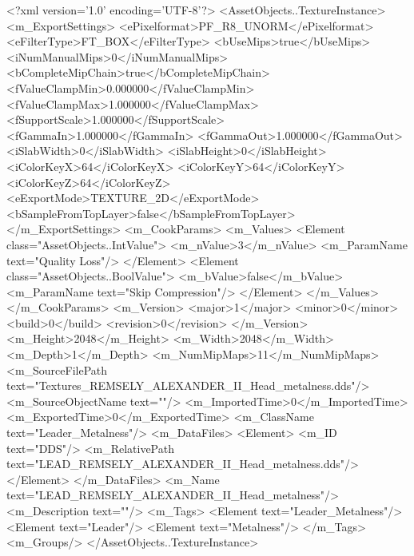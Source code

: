 <?xml version='1.0' encoding='UTF-8'?>
<AssetObjects..TextureInstance>
  <m_ExportSettings>
    <ePixelformat>PF_R8_UNORM</ePixelformat>
    <eFilterType>FT_BOX</eFilterType>
    <bUseMips>true</bUseMips>
    <iNumManualMips>0</iNumManualMips>
    <bCompleteMipChain>true</bCompleteMipChain>
    <fValueClampMin>0.000000</fValueClampMin>
    <fValueClampMax>1.000000</fValueClampMax>
    <fSupportScale>1.000000</fSupportScale>
    <fGammaIn>1.000000</fGammaIn>
    <fGammaOut>1.000000</fGammaOut>
    <iSlabWidth>0</iSlabWidth>
    <iSlabHeight>0</iSlabHeight>
    <iColorKeyX>64</iColorKeyX>
    <iColorKeyY>64</iColorKeyY>
    <iColorKeyZ>64</iColorKeyZ>
    <eExportMode>TEXTURE_2D</eExportMode>
    <bSampleFromTopLayer>false</bSampleFromTopLayer>
  </m_ExportSettings>
  <m_CookParams>
    <m_Values>
      <Element class="AssetObjects..IntValue">
        <m_nValue>3</m_nValue>
        <m_ParamName text="Quality Loss"/>
      </Element>
      <Element class="AssetObjects..BoolValue">
        <m_bValue>false</m_bValue>
        <m_ParamName text="Skip Compression"/>
      </Element>
    </m_Values>
  </m_CookParams>
  <m_Version>
    <major>1</major>
    <minor>0</minor>
    <build>0</build>
    <revision>0</revision>
  </m_Version>
  <m_Height>2048</m_Height>
  <m_Width>2048</m_Width>
  <m_Depth>1</m_Depth>
  <m_NumMipMaps>11</m_NumMipMaps>
  <m_SourceFilePath text="Textures\LEAD_REMSELY_ALEXANDER_II_Head_metalness.dds"/>
  <m_SourceObjectName text=""/>
  <m_ImportedTime>0</m_ImportedTime>
  <m_ExportedTime>0</m_ExportedTime>
  <m_ClassName text="Leader_Metalness"/>
  <m_DataFiles>
    <Element>
      <m_ID text="DDS"/>
      <m_RelativePath text="LEAD_REMSELY_ALEXANDER_II_Head_metalness.dds"/>
    </Element>
  </m_DataFiles>
  <m_Name text="LEAD_REMSELY_ALEXANDER_II_Head_metalness"/>
  <m_Description text=""/>
  <m_Tags>
    <Element text="Leader_Metalness"/>
    <Element text="Leader"/>
    <Element text="Metalness"/>
  </m_Tags>
  <m_Groups/>
</AssetObjects..TextureInstance>
